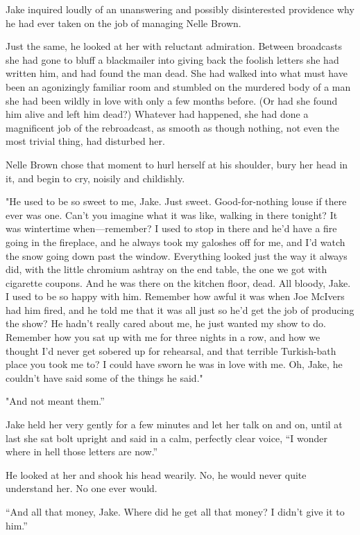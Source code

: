 \documentclass{novel}
\begin{document}
Jake inquired loudly of an unanswering and possibly disinterested providence why he had ever taken on the job of managing Nelle Brown.

Just the same, he looked at her with reluctant admiration. Between broadcasts she had gone to bluff a blackmailer into giving back the foolish letters she had written him, and had found the man dead. She had walked into what must have been an agonizingly familiar room and stumbled on the murdered body of a man she had been wildly in love with only a few months before. (Or had she found him alive and left him dead?) Whatever had happened, she had done a magnificent job of the rebroadcast, as smooth as though nothing, not even the most trivial thing, had disturbed her.

Nelle Brown chose that moment to hurl herself at his shoulder, bury her head in it, and begin to cry, noisily and childishly.

"He used to be so sweet to me, Jake. Just sweet. Good-for-nothing louse if there ever was one. Can't you imagine what it was like, walking in there tonight? It was wintertime when—remember? I used to stop in there and he'd have a fire going in the fireplace, and he always took my galoshes off for me, and I'd watch the snow going down past the window. Everything looked just the way it always did, with the little chromium ashtray on the end table, the one we got with cigarette coupons. And he was there on the kitchen floor, dead. All bloody, Jake. I used to be so happy with him. Remember how awful it was when Joe McIvers had him fired, and he told me that it was all just so he'd get the job of producing the show? He hadn't really cared about me, he just wanted my show to do. Remember how you sat up with me for three nights in a row, and how we thought I'd never get sobered up for rehearsal, and that terrible Turkish-bath place you took me to? I could have sworn he was in love with me. Oh, Jake, he couldn't have said some of the things he said."

"And not meant them.”

Jake held her very gently for a few minutes and let her talk on and on, until at last she sat bolt upright and said in a calm, perfectly clear voice, “I wonder where in hell those letters are now.”

He looked at her and shook his head wearily. No, he would never quite understand her. No one ever would.

“And all that money, Jake. Where did he get all that money? I didn’t give it to him.”
\end{document}
